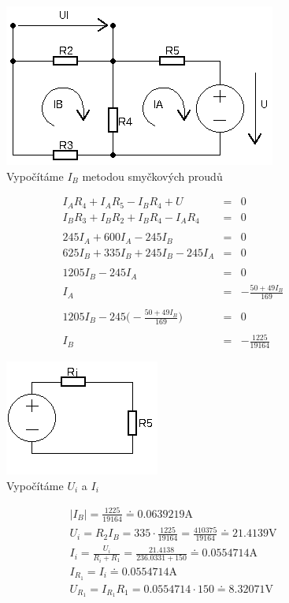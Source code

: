 \documentclass[12pt,a4paper]{article}
\begin{document}
\pagebreak
	\begin{figure}[H]
		\center\includegraphics[width=0.6\linewidth]{img7.png}
		\caption*{Vypočítáme $I_B$ metodou smyčkových proudů}
\end{figure}
\begin{eqnarray*}
	I_AR_4+I_AR_5-I_BR_4+U &= & 0\\
	I_BR_3+I_BR_2+I_BR_4-I_AR_4 &= & 0\\\\
	245 I_A + 600 I_A-245 I_B &= & 0\\
	625I_B+335I_B+245I_B-245I_A &= & 0\\\\
	1205I_B - 245I_A &= & 0\\
	I_A&= &-\frac{50+49I_B}{169}\\\\
	1205I_B-245\bigg( -\frac{50+49I_B}{169}\bigg) &= & 0\\\\
	I_B &=& -\frac{1225}{19164}	
\end{eqnarray*}
	\begin{figure}[H]
		\center\includegraphics[width=0.6\linewidth]{img8.png}
		\caption*{Vypočítáme $U_i$ a $I_i$}
\end{figure}
\begin{gather*}
	|I_B|=\frac{1225}{19164}\doteq0.0639219\text{A}\\[0.1cm]
	U_i = R_2I_B = 335\cdot\frac{1225}{19164} = \frac{410375}{19164}\doteq21.4139\text{V}\\[0.1cm]
	I_i = \frac{U_i}{R_i+R_1}=\frac{21.4138}{236.0331+150}\doteq0.0554714\text{A}\\[0.1cm]
	I_{R_1} = I_i\doteq0.0554714\text{A}\\
	U_{R_1} = I_{R_1}R_1 = 0.0554714\cdot150\doteq8.32071\text{V}
\end{gather*}
\end{document}
